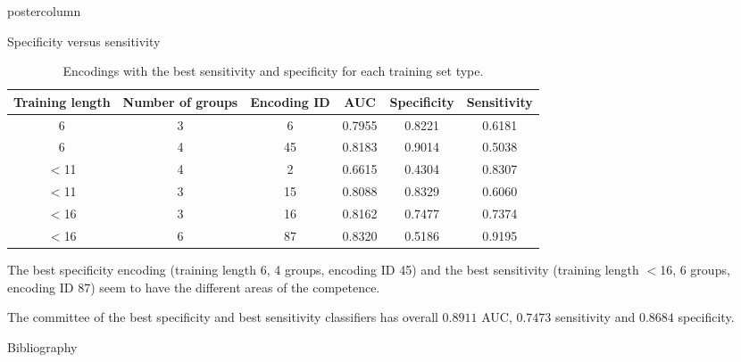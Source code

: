 \documentclass[final]{beamer}\usepackage[]{graphicx}\usepackage[]{color}
\begin{document}
\begin{frame}
\begin{columns}
\begin{column}{.50\textwidth}
\begin{beamercolorbox}[center,wd=\textwidth]{postercolumn}
\begin{minipage}[T]{.95\textwidth}
{\begin{block}{Specificity versus sensitivity}
\begin{table}[ht]
\centering
\begin{tabular}{c|c|c|c|c|c}
  \toprule
Training length & Number of groups & Encoding ID & AUC & Specificity & Sensitivity \\ 
  \midrule
6 & 3 & 6 & 0.7955 & 0.8221 & 0.6181 \\ 
   \rowcolor[gray]{0.75}6 & 4 & 45 & 0.8183 & 0.9014 & 0.5038 \\ 
  $<$11 & 4 & 2 & 0.6615 & 0.4304 & 0.8307 \\ 
   \rowcolor[gray]{0.75}$<$11 & 3 & 15 & 0.8088 & 0.8329 & 0.6060 \\ 
  $<$16 & 3 & 16 & 0.8162 & 0.7477 & 0.7374 \\ 
   \rowcolor[gray]{0.75}$<$16 & 6 & 87 & 0.8320 & 0.5186 & 0.9195 \\ 
   \bottomrule
\end{tabular}
\caption{Encodings with the best sensitivity and specificity for each training set type.} 
\end{table}


The best specificity encoding (training length 6, 4 groups, encoding ID 45) and the best sensitivity (training length $<$16, 6 groups, encoding ID 87) seem to have the different areas of the competence.

The committee of the best specificity and best sensitivity classifiers has overall $0.8911$ AUC, $0.7473$ sensitivity and $0.8684$ specificity.

\end{block}
\vfill

\begin{block}{Bibliography}
  \tiny{
  
  
  }
  \end{block}
  \vfill

}
\end{minipage}
\end{beamercolorbox}
\end{column}
\end{columns}  
\end{frame}
\end{document}
